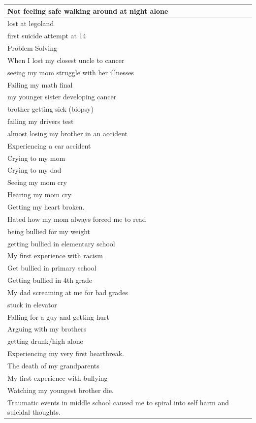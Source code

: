 \documentclass[
  .7em,
  letterpaper,
  DIV=11,
  numbers=noendperiod]{scrartcl}
\begin{document}
\begin{table}
\begin{tabular}{l}
\hline
Not feeling safe walking around at night alone\\
\hline
lost at legoland\\
\hline
first suicide attempt at 14\\
\hline
Problem Solving\\
\hline
When I lost my closest uncle to cancer\\
\hline
seeing my mom struggle with her illnesses\\
\hline
Failing my math final\\
\hline
my younger sister developing cancer\\
\hline
brother getting sick (biopsy)\\
\hline
failing my drivers test\\
\hline
almost losing my brother in an accident\\
\hline
Experiencing a car accident\\
\hline
Crying to my mom\\
\hline
Crying to my dad\\
\hline
Seeing my mom cry\\
\hline
Hearing my mom cry\\
\hline
Getting my heart broken.\\
\hline
Hated how my mom always forced me to read\\
\hline
being bullied for my weight\\
\hline
getting bullied in elementary school\\
\hline
My first experience with racism\\
\hline
Get bullied in primary school\\
\hline
Getting bullied in 4th grade\\
\hline
My dad screaming at me for bad grades\\
\hline
stuck in elevator\\
\hline
Falling for a guy and getting hurt\\
\hline
Arguing with my brothers\\
\hline
getting drunk/high alone\\
\hline
Experiencing my very first heartbreak.\\
\hline
The death of my grandparents\\
\hline
My first experience with bullying\\
\hline
Watching my youngest brother die.\\
\hline
Traumatic events in middle school caused me to spiral into self harm and suicidal thoughts.\\

\end{tabular}
\end{table}
\end{document}
